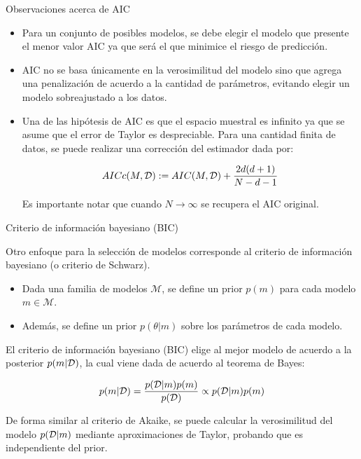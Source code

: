 \documentclass[handout, 9pt]{beamer}
\begin{document}
\begin{frame}{Observaciones acerca de AIC}
\begin{itemize}
	\item Para un conjunto de posibles modelos, se debe elegir el modelo que presente el menor valor AIC ya que será el que minimice el riesgo de predicción.\pause
	\item AIC no se basa únicamente en la verosimilitud del modelo sino que agrega una penalización de acuerdo a la cantidad de parámetros, evitando elegir un modelo sobreajustado a los datos.\pause
	\item  Una de las hipótesis de AIC es que el espacio muestral es infinito ya que se asume que el error de Taylor es despreciable. Para una cantidad finita de datos, se puede realizar una corrección del estimador dada por:
	
	\begin{equation*}
		AICc(M,{\mathcal D}) := AIC(M,{\mathcal D}) + \frac{2d(d+1)}{N-d-1}
	\end{equation*}
	
	Es importante notar que cuando $N\to\infty$ se recupera el AIC original.
\end{itemize}
	
\end{frame}

\begin{frame}{Criterio de información bayesiano (BIC)}

Otro enfoque para la selección de modelos corresponde al criterio de información bayesiano (o criterio de Schwarz).\pause

\begin{itemize}
	\item Dada una familia de modelos $\mathcal{M}$, se define un prior $p(m)$ para cada modelo $m\in\mathcal{M}$.\pause
	\item Además, se define un prior $p(\theta|m)$ sobre los parámetros de cada modelo.\pause
\end{itemize}

   El criterio de información bayesiano (BIC) elige al mejor modelo de acuerdo a la posterior $p(m|{\mathcal D})$, la cual viene dada de acuerdo al teorema de Bayes:

\begin{equation*}
	p(m|{\mathcal D})=\frac{p({\mathcal D}|m)p(m)}{p({\mathcal D})}\propto p({\mathcal D}|m)p(m)
\end{equation*}\pause

De forma similar al criterio de Akaike, se puede calcular la verosimilitud del modelo $p({\mathcal D}|m)$ mediante aproximaciones de Taylor, probando que es independiente del prior. 
	
\end{frame}
\end{document}
